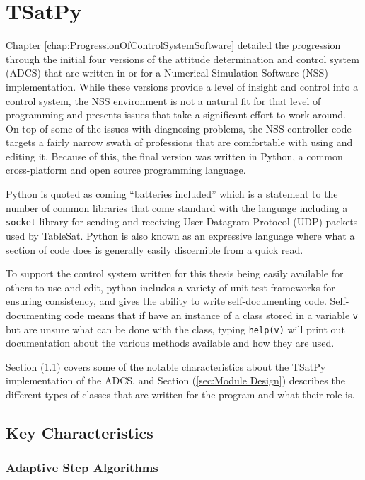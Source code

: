 
\chapter{TSatPy}
\label{chap:TSatPy}

Chapter \ref{chap:ProgressionOfControlSystemSoftware} detailed the progression through the initial four versions of the attitude determination and control system (ADCS) that are written in or for a Numerical Simulation Software (NSS) implementation.  While these versions provide a level of insight and control into a control system, the NSS environment is not a natural fit for that level of programming and presents issues that take a significant effort to work around.  On top of some of the issues with diagnosing problems, the NSS controller code targets a fairly narrow swath of professions that are comfortable with using and editing it.  Because of this, the final version was written in Python, a common cross-platform and open source programming language.

Python is quoted as coming ``batteries included'' which is a statement to the number of common libraries that come standard with the language including a \verb|socket| library for sending and receiving User Datagram Protocol (UDP) packets used by TableSat.  Python is also known as an expressive language where what a section of code does is generally easily discernible from a quick read.

To support the control system written for this thesis being easily available for others to use and edit, python includes a variety of unit test frameworks for ensuring consistency, and gives the ability to write self-documenting code.  Self-documenting code means that if have an instance of a class stored in a variable \verb|v| but are unsure what can be done with the class, typing \verb|help(v)| will print out documentation about the various methods available and how they are used.

Section (\ref{sec:KeyCharacteristics}) covers some of the notable characteristics about the TSatPy implementation of the ADCS, and Section (\ref{sec:Module Design}) describes the different types of classes that are written for the program and what their role is.

\section{Key Characteristics}
\label{sec:KeyCharacteristics}

\subsection{Adaptive Step Algorithms}

